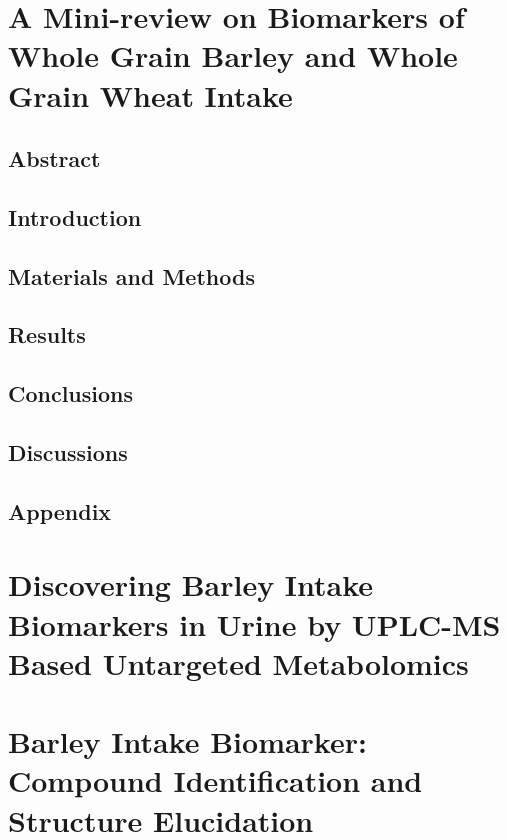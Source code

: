 \documentclass[]{report}
\begin{document}
%

\chapter{A Mini-review on Biomarkers of Whole Grain Barley and Whole Grain Wheat Intake}
	\section{Abstract}
	\section{Introduction}
	
	
	\section{Materials and Methods}
	
	
	\section{Results}
	
		
	\section{Conclusions}
	
	
	\section{Discussions}
	
	\newpage
	\section{Appendix}
	

\chapter{Discovering Barley Intake Biomarkers in Urine by UPLC-MS Based Untargeted Metabolomics}
	

\chapter{Barley Intake Biomarker: Compound Identification and Structure Elucidation}

\end{document}
